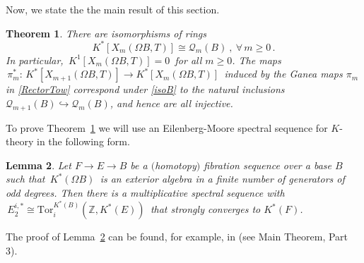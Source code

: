 \documentclass[11pt]{amsart}
\newtheorem{theorem}{Theorem}[section]
\newtheorem{lemma}[theorem]{Lemma}
\theoremstyle{definition}
\theoremstyle{remark}
\numberwithin{equation}{section}
\newcommand{\la}{\label}
\newcommand{\into}{\hookrightarrow}
\def\cQ{\mathcal{Q}}
\def\Z{\mathbb{Z}}
\begin{document}
Now, we state the the main result of this section.
%
\begin{theorem} 
\la{RectorQI}
There are isomorphisms of rings 
\begin{equation}
\la{isoB}
K^{\ast}[X_m(\Omega B, T)] \cong \cQ_{m}(B) \ , \ \forall\,m \ge 0\,. 
\end{equation}
%
In particular, $\,K^1[X_m(\Omega B,T)] = 0\,$ for all $m\ge 0$. The maps $\,\pi_m^{\ast}:\,K^{\ast}[X_{m+1}(\Omega B, T)] \to K^{\ast}[X_m(\Omega B, T)]\,$ induced by the Ganea maps $ \pi_m $ in \eqref{RectorTow}  correspond under \eqref{isoB} to the natural inclusions $ \cQ_{m+1}(B) \into \cQ_{m}(B)$, and hence are all injective.
\end{theorem}
%
To prove Theorem~\ref{RectorQI} we will use an Eilenberg-Moore spectral sequence for $K$-theory  in the following form.
%
\begin{lemma} 
\la{EMK}
Let $F \to E \to B$ be a $($homotopy$)$ fibration sequence over a base $B$ such that $\,K^{\ast}(\Omega B)
\,$ is an exterior algebra in a finite number of generators of odd degrees. Then there is a multiplicative spectral sequence with 
$\,E_2^{i, \ast} \cong \mathrm{Tor}^{K^{\ast}(B)}_i(\Z, K^{\ast}(E)) \,$
that strongly converges to $K^{\ast}(F)$.
\end{lemma}
%
The proof of Lemma~\ref{EMK} can be found, for example, in \cite{JO99} (see Main Theorem, Part 3).
%
\end{document}
